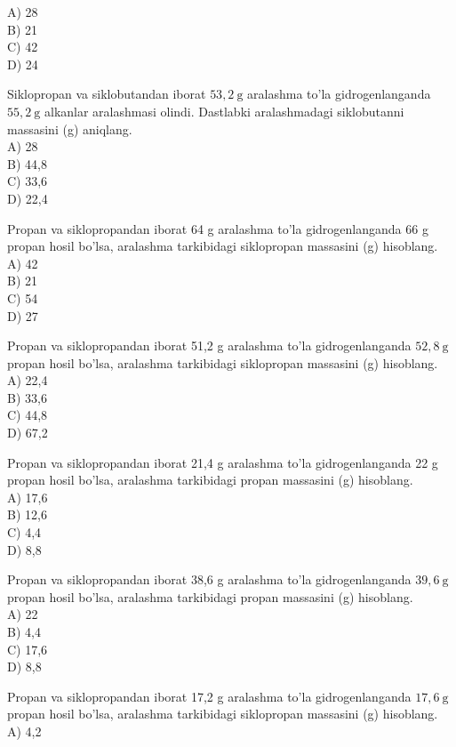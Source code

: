 A) 28\\
B) 21\\
C) 42\\
D) 24
  \item Siklopropan va siklobutandan iborat $53,2 \mathrm{~g}$ aralashma to'la gidrogenlanganda $55,2 \mathrm{~g}$ alkanlar aralashmasi olindi. Dastlabki aralashmadagi siklobutanni massasini (g) aniqlang.\\
A) 28\\
B) 44,8\\
C) 33,6\\
D) 22,4
  \item Propan va siklopropandan iborat 64 g aralashma to'la gidrogenlanganda 66 g propan hosil bo'lsa, aralashma tarkibidagi siklopropan massasini (g) hisoblang.\\
A) 42\\
B) 21\\
C) 54\\
D) 27\\
  \item Propan va siklopropandan iborat 51,2 g aralashma to'la gidrogenlanganda $52,8 \mathrm{~g}$\\
propan hosil bo'lsa, aralashma tarkibidagi siklopropan massasini (g) hisoblang.\\
A) 22,4\\
B) 33,6\\
C) 44,8\\
D) 67,2
  \item Propan va siklopropandan iborat 21,4 g aralashma to'la gidrogenlanganda 22 g propan hosil bo'lsa, aralashma tarkibidagi propan massasini (g) hisoblang.\\
A) 17,6\\
B) 12,6\\
C) 4,4\\
D) 8,8
  \item Propan va siklopropandan iborat 38,6 g aralashma to'la gidrogenlanganda $39,6 \mathrm{~g}$ propan hosil bo'lsa, aralashma tarkibidagi propan massasini (g) hisoblang.\\
A) 22\\
B) 4,4\\
C) 17,6\\
D) 8,8
  \item Propan va siklopropandan iborat 17,2 g aralashma to'la gidrogenlanganda $17,6 \mathrm{~g}$ propan hosil bo'lsa, aralashma tarkibidagi siklopropan massasini (g) hisoblang.\\
A) 4,2\\
